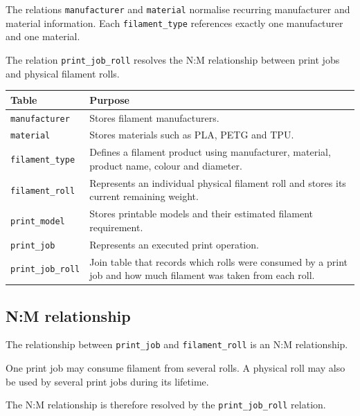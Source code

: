 \documentclass[a4paper,11pt]{article}
\begin{document}
The relations \texttt{manufacturer} and \texttt{material} normalise recurring
manufacturer and material information. Each \texttt{filament\_type} references
exactly one manufacturer and one material.

The relation \texttt{print\_job\_roll} resolves the N:M relationship between
print jobs and physical filament rolls.

\begin{tabularx}{\linewidth}{@{}p{4cm}X@{}}
\toprule
\textbf{Table} & \textbf{Purpose} \\
\midrule

\texttt{manufacturer}
  & Stores filament manufacturers. \\

\texttt{material}
  & Stores materials such as PLA, PETG and TPU. \\

\texttt{filament\_type}
  & Defines a filament product using manufacturer, material,
    product name, colour and diameter. \\

\texttt{filament\_roll}
  & Represents an individual physical filament roll and stores
    its current remaining weight. \\

\texttt{print\_model}
  & Stores printable models and their estimated filament requirement. \\

\texttt{print\_job}
  & Represents an executed print operation. \\

\texttt{print\_job\_roll}
  & Join table that records which rolls were consumed by a print job
    and how much filament was taken from each roll. \\

\bottomrule
\end{tabularx}

\subsection{N:M relationship}

The relationship between \texttt{print\_job} and \texttt{filament\_roll} is
an N:M relationship.

One print job may consume filament from several rolls. A physical roll may
also be used by several print jobs during its lifetime.

The N:M relationship is therefore resolved by the
\texttt{print\_job\_roll} relation.
\end{document}
